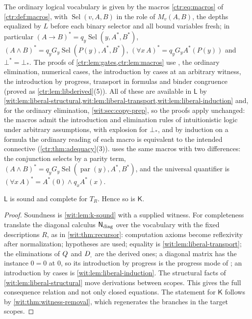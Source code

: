 The ordinary logical vocabulary is given by the macros
\eqref{ctr:eq:macros} of \cref{ctr:def:macros}, with
$\operatorname{Sel}(v,A,B)$ in the role of $M_v(A,B)$, the depths
equalized by $L$ before each binary selector and all bound variables fresh;
in particular $(A\to B)^{*}=q_y\operatorname{Sel}(y,A^{*},B^{*})$,
$(A\wedge B)^{*}=q_yG_y\operatorname{Sel}(P(y),A^{*},B^{*})$,
$(\forall x\,A)^{*}=q_yG_yA^{*}(P(y))$ and $\bot^{*}=\bot_{*}$.  The proofs
of \cref{ctr:lem:gates,ctr:lem:macros} use , the ordinary
elimination, numerical cases, the introduction by cases at an arbitrary
witness, the introduction by progress, transport in formulas and binder
congruence (proved as \cref{ctr:lem:libderived}(5)).  All of these are
available in $\mathsf{L}$ by
\cref{wit:lem:liberal-structural,wit:lem:liberal-transport,wit:lem:liberal-induction}
and, for the ordinary elimination, \cref{wit:sec:copy-prep}, so the proofs
apply unchanged: the macros admit the introduction and
elimination rules of intuitionistic logic under arbitrary assumptions, with
explosion for $\bot_{*}$, and by induction on a formula the ordinary reading
of each macro is equivalent to the intended connective
(\cref{ctr:thm:adequacy}(3)).
 uses the same macros with two differences: the
conjunction selects by a parity term,
$(A\wedge B)^{*}=q_yG_y\operatorname{Sel}(\operatorname{par}(y),A^{*},B^{*})$,
and the universal quantifier is
$(\forall x\,A)^{*}=A^{*}(0)\wedge q_xA^{*}(x)$.

\begin{proposition}
\label{wit:prop:liberal}
$\mathsf{L}$ is sound and complete for $T_R$.  Hence so is $\mathsf{K}$.
\end{proposition}

\begin{proof}
Soundness is \cref{wit:lem:k-sound} with a supplied witness.  For
completeness translate the diagonal calculus $\mathsf{N}_{\mathrm{diag}}$ over the
vocabulary with the fixed descriptions $R$, as in \cref{wit:thm:recursor}:
computation axioms become reflexivity after normalization; hypotheses are
used; equality is \cref{wit:lem:liberal-transport}; the eliminations of
$Q_{}$ and $D_{,}$ are the derived ones; a diagonal matrix has the instance
$0=0$ at $0$, so its introduction by progress is the progress mode of
; an introduction by cases is
\cref{wit:lem:liberal-induction}.  The structural facts of
\cref{wit:lem:liberal-structural} move derivations between scopes.  This
gives the full consequence relation and not only closed equations.  The
statement for $\mathsf{K}$ follows by \cref{wit:thm:witness-removal}, which
regenerates the branches in the target scopes.
\end{proof}

